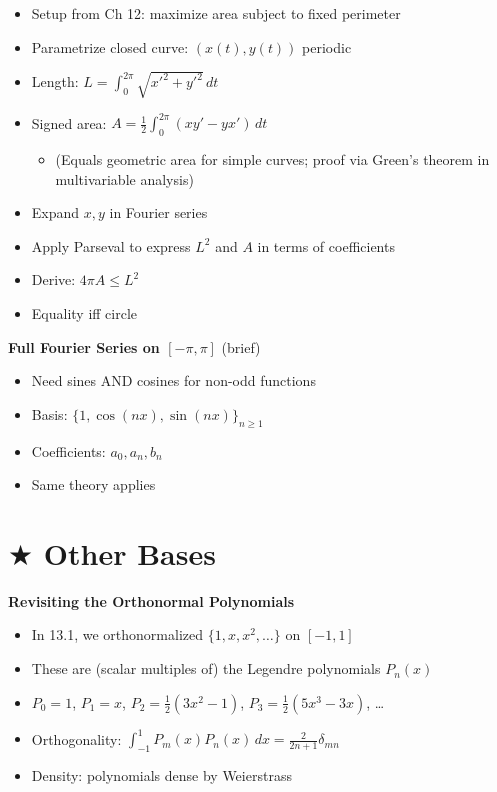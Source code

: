 \documentclass[
  10pt,
  letterpaper,
]{scrbook}
\providecommand{\tightlist}{%
  \setlength{\itemsep}{0pt}\setlength{\parskip}{0pt}}
\begin{document}
\begin{itemize}
\tightlist
\item
  Setup from Ch 12: maximize area subject to fixed perimeter
\item
  Parametrize closed curve: \((x(t), y(t))\) periodic
\item
  Length: \(L = \int_0^{2\pi} \sqrt{x'^2 + y'^2}\, dt\)
\item
  Signed area: \(A = \frac{1}{2}\int_0^{2\pi}(xy' - yx')\, dt\)

  \begin{itemize}
  \tightlist
  \item
    (Equals geometric area for simple curves; proof via Green's theorem
    in multivariable analysis)
  \end{itemize}
\item
  Expand \(x, y\) in Fourier series
\item
  Apply Parseval to express \(L^2\) and \(A\) in terms of coefficients
\item
  Derive: \(4\pi A \leq L^2\)
\item
  Equality iff circle
\end{itemize}

\textbf{Full Fourier Series on \([-\pi, \pi]\)} (brief)

\begin{itemize}
\tightlist
\item
  Need sines AND cosines for non-odd functions
\item
  Basis: \(\{1, \cos(nx), \sin(nx)\}_{n \geq 1}\)
\item
  Coefficients: \(a_0, a_n, b_n\)
\item
  Same theory applies
\end{itemize}

\section{\texorpdfstring{\(\bigstar\) Other
Bases}{\textbackslash bigstar Other Bases}}\label{bigstar-other-bases}

\textbf{Revisiting the Orthonormal Polynomials}

\begin{itemize}
\tightlist
\item
  In 13.1, we orthonormalized \(\{1, x, x^2, \ldots\}\) on \([-1,1]\)
\item
  These are (scalar multiples of) the Legendre polynomials \(P_n(x)\)
\item
  \(P_0 = 1\), \(P_1 = x\), \(P_2 = \frac{1}{2}(3x^2 - 1)\),
  \(P_3 = \frac{1}{2}(5x^3 - 3x)\), \ldots{}
\item
  Orthogonality:
  \(\int_{-1}^1 P_m(x) P_n(x)\, dx = \frac{2}{2n+1}\delta_{mn}\)
\item
  Density: polynomials dense by Weierstrass
\end{itemize}
\end{document}
